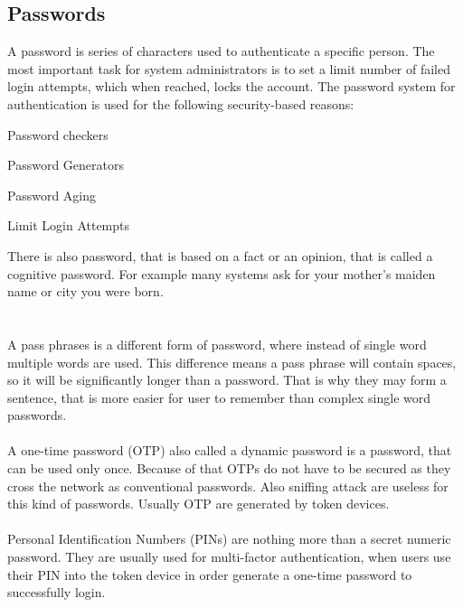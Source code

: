 \documentclass[twoside]{article}
\begin{document}
\begin{multicols}{2}


\section{Passwords}
A password is series of characters used to authenticate a specific person. The most important task for system administrators is to set a limit number of failed login attempts, which when reached, locks the account. The password system for authentication is used for the following security-based reasons:
\begin{compactitem}
\item Password checkers
\item Password Generators
\item Password Aging
\item Limit Login Attempts
\end{compactitem}
There is also password, that is based on a fact or an opinion, that is called a cognitive password. For example many systems ask for your mother's maiden name or city you were born.\\\\\\
A pass phrases is a different form of password, where instead of single word multiple words are used. This difference means a pass phrase will contain spaces, so it will be significantly longer than a password. That is why they may form a sentence, that is more easier for user to remember than complex single word passwords.\\\\
A one-time password (OTP) also called a dynamic password is a password, that can be used only once. Because of that OTPs do not have to be secured as they cross the network as conventional passwords. Also sniffing attack are useless for this kind of passwords. Usually OTP are generated by token devices.\\\\
Personal Identification Numbers (PINs) are nothing more than a secret numeric password. They are usually used for multi-factor authentication, when users use their PIN into the token device in order generate a one-time password to successfully login.




\end{multicols}
\end{document}
